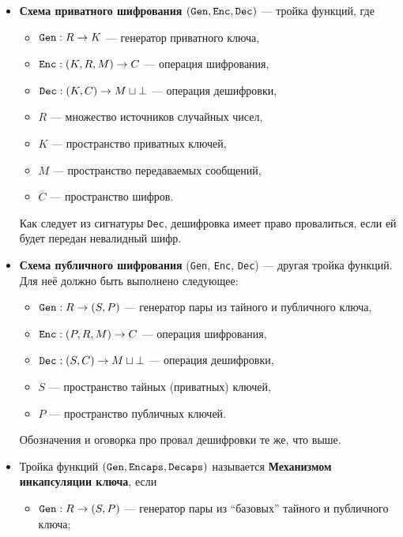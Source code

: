 \documentclass[a4paper,14pt]{extarticle}
\begin{document}
\begin{itemize}
    \item \textbf{Схема приватного шифрования}
        $(\verb|Gen|, \verb|Enc|, \verb|Dec|)$ --- тройка функций, где
        \begin{itemize}
            \item $\verb|Gen|: R \to K$ --- генератор приватного ключа,
            \item $\verb|Enc|: (K, R, M) \to C$ --- операция шифрования,
            \item $\verb|Dec|: (K, C) \to M \sqcup \bot$ --- операция
                дешифровки,
            \item $R$ --- множество источников случайных чисел,
            \item $K$ --- пространство приватных ключей,
            \item $M$ --- пространство передаваемых сообщений,
            \item $C$ --- пространство шифров.
        \end{itemize}
        Как следует из сигнатуры \verb|Dec|, дешифровка имеет право провалиться,
        если ей будет передан невалидный шифр.
    \item \textbf{Схема публичного шифрования}
        (\verb|Gen|, \verb|Enc|, \verb|Dec|) --- другая тройка функций. Для неё
        должно быть выполнено следующее:
        \begin{itemize}
            \item $\verb|Gen|: R \to (S, P)$ --- генератор пары
                из тайного и публичного ключа,
            \item $\verb|Enc|: (P, R, M) \to C$ --- операция шифрования,
            \item $\verb|Dec|: (S, C) \to M \sqcup \bot$ --- операция
                дешифровки,
            \item $S$ --- пространство тайных (приватных) ключей,
            \item $P$ --- пространство публичных ключей.
        \end{itemize}
        Обозначения и оговорка про провал дешифровки те же, что выше.
    \item Тройка функций $(\verb|Gen|, \verb|Encaps|, \verb|Decaps|)$ называется
        \textbf{Механизмом инкапсуляции ключа}, если
        \begin{itemize}
            \item $\verb|Gen|: R \to (S, P)$ --- генератор пары
                из ``базовых'' тайного и публичного ключа;

\end{itemize}
\end{itemize}
\end{document}
